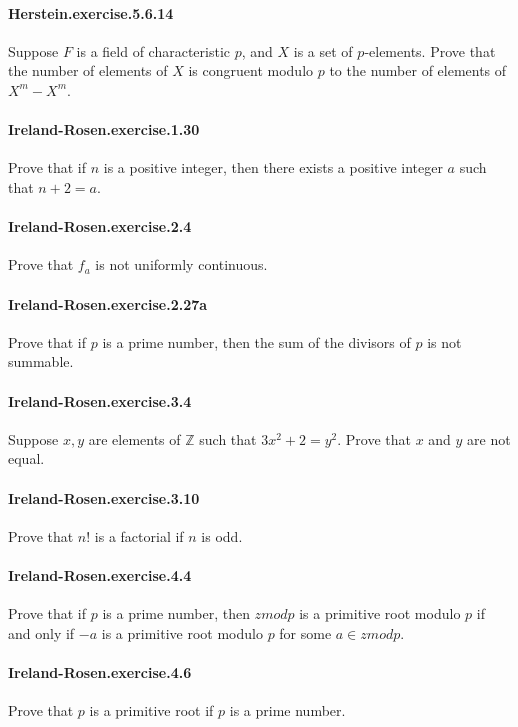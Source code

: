 \documentclass{article}
\begin{document}
\paragraph{Herstein.exercise.5.6.14} Suppose $F$ is a field of characteristic $p$, and $X$ is a set of $p$-elements. Prove that the number of elements of $X$ is congruent modulo $p$ to the number of elements of $X^m - X^m$.

\paragraph{Ireland-Rosen.exercise.1.30} Prove that if $n$ is a positive integer, then there exists a positive integer $a$ such that $n+2 = a$.

\paragraph{Ireland-Rosen.exercise.2.4} Prove that $f_a$ is not uniformly continuous.

\paragraph{Ireland-Rosen.exercise.2.27a} Prove that if $p$ is a prime number, then the sum of the divisors of $p$ is not summable.

\paragraph{Ireland-Rosen.exercise.3.4} Suppose $x, y$ are elements of $\mathbb{Z}$ such that $3x^2 + 2 = y^2$. Prove that $x$ and $y$ are not equal.

\paragraph{Ireland-Rosen.exercise.3.10} Prove that $n!$ is a factorial if $n$ is odd.

\paragraph{Ireland-Rosen.exercise.4.4} Prove that if $p$ is a prime number, then $zmod p$ is a primitive root modulo $p$ if and only if $-a$ is a primitive root modulo $p$ for some $a \in zmod p$.

\paragraph{Ireland-Rosen.exercise.4.6} Prove that $p$ is a primitive root if $p$ is a prime number.
\end{document}
